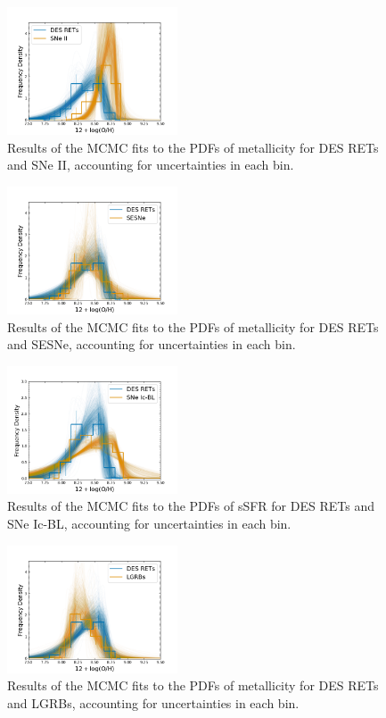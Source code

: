 \documentclass[fleqn,usenatbib,]{mnras}
\begin{document}
\begin{figure}
\includegraphics[width=0.45\textwidth]{mc_figs/rets_s13_OH_histfit_final.png}
\caption{Results of the MCMC fits to the PDFs of metallicity for DES RETs and SNe II, accounting for uncertainties in each bin.
\label{fig:histfit_oh_s13}}
\end{figure}
\begin{figure}
\includegraphics[width=0.45\textwidth]{mc_figs/rets_s12_OH_histfit_final.png}
\caption{Results of the MCMC fits to the PDFs of metallicity for DES RETs and SESNe, accounting for uncertainties in each bin.
\label{fig:histfit_oh_s12}}
\end{figure}
\begin{figure}
\includegraphics[width=0.45\textwidth]{mc_figs/rets_m19_OH_histfit_final.png}
\caption{Results of the MCMC fits to the PDFs of sSFR for DES RETs and SNe Ic-BL, accounting for uncertainties in each bin.
\label{fig:histfit_oh_m19}}
\end{figure}
\begin{figure}
\includegraphics[width=0.45\textwidth]{mc_figs/rets_k15_OH_histfit_final.png}
\caption{Results of the MCMC fits to the PDFs of metallicity for DES RETs and LGRBs, accounting for uncertainties in each bin.
\label{fig:histfit_oh_k15}}
\end{figure}
\end{document}
